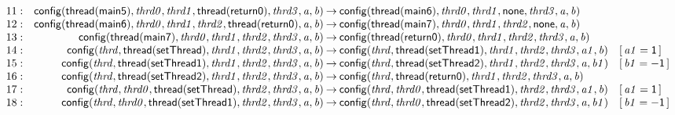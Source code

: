 \documentclass[a4paper]{article}
\newcommand{\symb}[1]{\mathsf{#1}}
\newcommand{\var}[1]{\mathit{#1}}
\newcommand{\Constraint}[1]{[\, #1 \,]}
\begin{document}
\begin{landscape}
\[\begin{array}{rr@{\>}c@{\>}ll}
\mathrm{11} : 
 & \symb{config}(\symb{thread}(\symb{main5}),\var{thrd0},\var{thrd1},\symb{thread}(\symb{return0}),\var{thrd3},\var{a},\var{b})
 & \to 
 & \symb{config}(\symb{thread}(\symb{main6}),\var{thrd0},\var{thrd1},\symb{none},\var{thrd3},\var{a},\var{b})\\

\mathrm{12} : 
 & \symb{config}(\symb{thread}(\symb{main6}),\var{thrd0},\var{thrd1},\var{thrd2},\symb{thread}(\symb{return0}),\var{a},\var{b})
 & \to 
 & \symb{config}(\symb{thread}(\symb{main7}),\var{thrd0},\var{thrd1},\var{thrd2},\symb{none},\var{a},\var{b})\\

\mathrm{13} : 
 & \symb{config}(\symb{thread}(\symb{main7}),\var{thrd0},\var{thrd1},\var{thrd2},\var{thrd3},\var{a},\var{b})
 & \to 
 & \symb{config}(\symb{thread}(\symb{return0}),\var{thrd0},\var{thrd1},\var{thrd2},\var{thrd3},\var{a},\var{b})\\

\mathrm{14} : 
 & \symb{config}(\var{thrd},\symb{thread}(\symb{setThread}),\var{thrd1},\var{thrd2},\var{thrd3},\var{a},\var{b})
 & \to 
 & \symb{config}(\var{thrd},\symb{thread}(\symb{setThread1}),\var{thrd1},\var{thrd2},\var{thrd3},\var{a1},\var{b})
 & \Constraint{\var{a1} = \symb{1}}\\

\mathrm{15} : 
 & \symb{config}(\var{thrd},\symb{thread}(\symb{setThread1}),\var{thrd1},\var{thrd2},\var{thrd3},\var{a},\var{b})
 & \to 
 & \symb{config}(\var{thrd},\symb{thread}(\symb{setThread2}),\var{thrd1},\var{thrd2},\var{thrd3},\var{a},\var{b1})
 & \Constraint{\var{b1} = \symb{-1}}\\

\mathrm{16} : 
 & \symb{config}(\var{thrd},\symb{thread}(\symb{setThread2}),\var{thrd1},\var{thrd2},\var{thrd3},\var{a},\var{b})
 & \to 
 & \symb{config}(\var{thrd},\symb{thread}(\symb{return0}),\var{thrd1},\var{thrd2},\var{thrd3},\var{a},\var{b})\\

\mathrm{17} : 
 & \symb{config}(\var{thrd},\var{thrd0},\symb{thread}(\symb{setThread}),\var{thrd2},\var{thrd3},\var{a},\var{b})
 & \to 
 & \symb{config}(\var{thrd},\var{thrd0},\symb{thread}(\symb{setThread1}),\var{thrd2},\var{thrd3},\var{a1},\var{b})
 & \Constraint{\var{a1} = \symb{1}}\\

\mathrm{18} : 
 & \symb{config}(\var{thrd},\var{thrd0},\symb{thread}(\symb{setThread1}),\var{thrd2},\var{thrd3},\var{a},\var{b})
 & \to 
 & \symb{config}(\var{thrd},\var{thrd0},\symb{thread}(\symb{setThread2}),\var{thrd2},\var{thrd3},\var{a},\var{b1})
 & \Constraint{\var{b1} = \symb{-1}}\\


\end{array}\]
\end{landscape}
\end{document}
